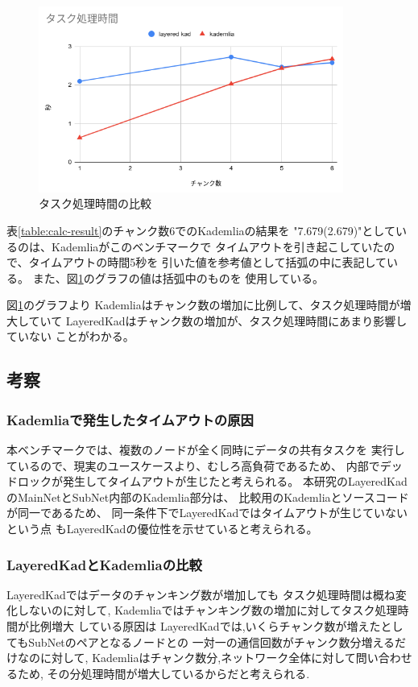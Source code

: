 \documentclass[sotsuron]{jcsie}
\begin{document}
\begin{figure}[H]
	\centering
	\includegraphics[width=10cm]{./assets/image/calc_compare.png}
	\caption{タスク処理時間の比較}
	\label{fig:calc_compare.png}
\end{figure}

表\ref{table:calc-result}のチャンク数6でのKademliaの結果を
"7.679(2.679)"としているのは、Kademliaがこのベンチマークで
タイムアウトを引き起こしていたので、タイムアウトの時間5秒を
引いた値を参考値として括弧の中に表記している。
また、図\ref{fig:calc_compare.png}のグラフの値は括弧中のものを
使用している。

図\ref{fig:calc_compare.png}のグラフより
Kademliaはチャンク数の増加に比例して、タスク処理時間が増大していて
LayeredKadはチャンク数の増加が、タスク処理時間にあまり影響していない
ことがわかる。

\subsection{考察}
\subsubsection{Kademliaで発生したタイムアウトの原因}
本ベンチマークでは、複数のノードが全く同時にデータの共有タスクを
実行しているので、現実のユースケースより、むしろ高負荷であるため、
内部でデッドロックが発生してタイムアウトが生じたと考えられる。
本研究のLayeredKadのMainNetとSubNet内部のKademlia部分は、
比較用のKademliaとソースコードが同一であるため、
同一条件下でLayeredKadではタイムアウトが生じていないという点
もLayeredKadの優位性を示せていると考えられる。
\subsubsection{LayeredKadとKademliaの比較}
LayeredKadではデータのチャンキング数が増加しても
タスク処理時間は概ね変化しないのに対して,
Kademliaではチャンキング数の増加に対してタスク処理時間が比例増大
している原因は
LayeredKadでは,いくらチャンク数が増えたとしてもSubNetのペアとなるノードとの
一対一の通信回数がチャンク数分増えるだけなのに対して,
Kademliaはチャンク数分,ネットワーク全体に対して問い合わせるため,
その分処理時間が増大しているからだと考えられる.
\end{document}
